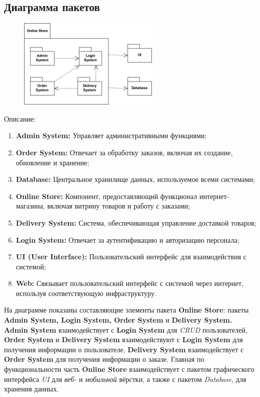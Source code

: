 \documentclass[a4paper]{report}
\begin{document}
\subsection{Диаграмма пакетов}
\begin{figure}[H]
    \centering
    \includegraphics[width=0.6\textwidth]{Диаграмма пакетов.png}
\end{figure}
Описание:
\begin{enumerate}
    \item \textbf{Admin System:} Управляет административными функциями;
    \item \textbf{Order System:} Отвечает за обработку заказов, включая их создание, обновление и хранение;
    \item \textbf{Database:} Центральное хранилище данных, используемое всеми системами;
    \item \textbf{Online Store:} Компонент, предоставляющий функционал интернет-магазина, включая витрину товаров и работу с заказами;
    \item \textbf{Delivery System:} Система, обеспечивающая управление доставкой товаров;
    \item \textbf{Login System:} Отвечает за аутентификацию и авторизацию персонала;
    \item \textbf{UI (User Interface):} Пользовательский интерфейс для взаимодействия с системой;
    \item \textbf{Web:} Связывает пользовательский интерфейс с системой через интернет, используя соответствующую инфраструктуру.
\end{enumerate}
На диаграмме показаны составляющие элементы пакета \textbf{Online Store}: пакеты \textbf{Admin System, Login System, Order System} и \textbf{Delivery System. Admin System} взаимодействует с \textbf{Login System} для \textit{CRUD} пользователей, \textbf{Order System} и \textbf{Delivery System} взаимодействуют с \textbf{Login System} для получения информации о пользователе, \textbf{Delivery System} взаимодействует с \textbf{Order System} для получения информации о заказе. Главная по функциональности часть \textbf{Online Store} взаимодействует с пакетом графического интерфейса \textit{UI} для \textit{веб-} и \textit{мобильной} вёрстки, а также с пакетом \textit{Database}, для хранения данных.
\end{document}
